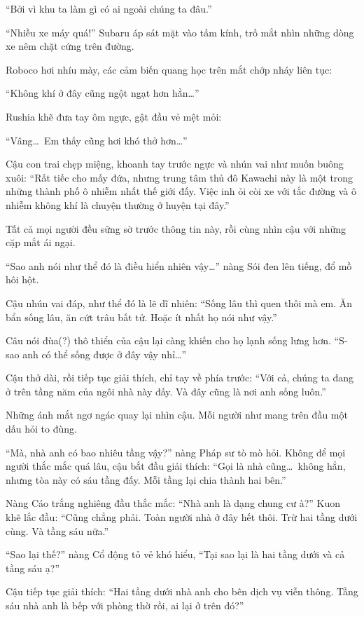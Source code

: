 \documentclass[../main.tex]{subfiles}
\begin{document}
``Bởi vì khu ta làm gì có ai ngoài chúng ta đâu.''

``Nhiều xe máy quá!'' Subaru áp sát mặt vào tấm kính, trố mắt nhìn những dòng xe nêm chặt cứng trên đường.

Roboco hơi nhíu mày, các cảm biến quang học trên mắt chớp nháy liên tục:

``Không khí ở đây cũng ngột ngạt hơn hẳn\dots''

Rushia khẽ đưa tay ôm ngực, gật đầu vẻ mệt mỏi:

``Vâng\dots\ Em thấy cũng hơi khó thở hơn\dots''

Cậu con trai chẹp miệng, khoanh tay trước ngực và nhún vai như muốn buông xuôi: ``Rất tiếc cho mấy đứa, nhưng trung tâm thủ đô Kawachi này là một trong những thành phố ô nhiễm nhất thế giới đấy. Việc inh ỏi còi xe với tắc đường và ô nhiễm không khí là chuyện thường ở huyện tại đây.''

Tất cả mọi người đều sững sờ trước thông tin này, rồi cùng nhìn cậu với những cặp mắt ái ngại.

``Sao anh nói như thể đó là điều hiển nhiên vậy\dots'' nàng Sói đen lên tiếng, đổ mồ hôi hột.

Cậu nhún vai đáp, như thể đó là lẽ dĩ nhiên: ``Sống lâu thì quen thôi mà em. Ăn bẩn sống lâu, ăn cứt trâu bất tử. Hoặc ít nhất họ nói như vậy.''

Câu nói đùa(?) thô thiển của cậu lại càng khiến cho họ lạnh sống lưng hơn. ``S-sao anh có thể sống được ở đây vậy nhỉ\dots''

Cậu thở dài, rồi tiếp tục giải thích, chỉ tay về phía trước: ``Với cả, chúng ta đang ở trên tầng năm của ngôi nhà này đấy. Và đây cũng là nơi anh sống luôn.''

Những ánh mắt ngơ ngác quay lại nhìn cậu. Mỗi người như mang trên đầu một dấu hỏi to đùng.

``Mà, nhà anh có bao nhiêu tầng vậy?'' nàng Pháp sư tò mò hỏi. Không để mọi người thắc mắc quá lâu, cậu bắt đầu giải thích: ``Gọi là nhà cũng\dots\ không hẳn, nhưng tòa này có sáu tầng đấy. Mỗi tầng lại chia thành hai bên.''

Nàng Cáo trắng nghiêng đầu thắc mắc: ``Nhà anh là dạng chung cư à?'' Kuon khẽ lắc đầu: ``Cũng chẳng phải. Toàn người nhà ở đây hết thôi. Trừ hai tầng dưới cùng. Và tầng sáu nữa.''

``Sao lại thế?'' nàng Cổ động tỏ vẻ khó hiểu, ``Tại sao lại là hai tầng dưới và cả tầng sáu ạ?''

Cậu tiếp tục giải thích: ``Hai tầng dưới nhà anh cho bên dịch vụ viễn thông. Tầng sáu nhà anh là bếp với phòng thờ rồi, ai lại ở trên đó?''
\end{document}
